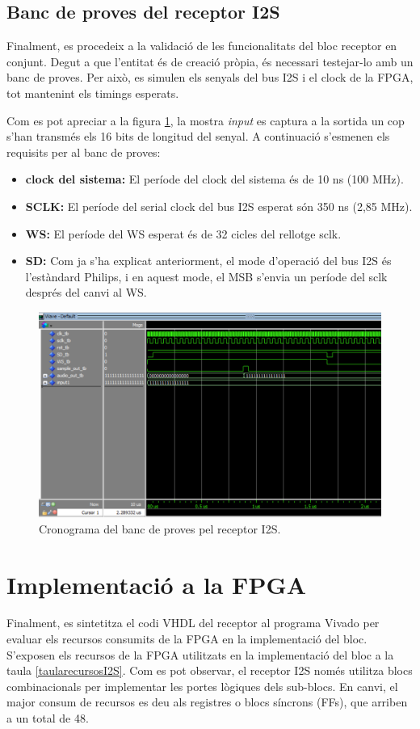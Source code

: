 \subsection{Banc de proves del receptor I2S}
\par Finalment, es procedeix a la validació de les funcionalitats del bloc receptor en conjunt. Degut a que l'entitat és de creació pròpia, és necessari testejar-lo amb un banc de proves. Per això, es simulen els senyals del bus I2S i el clock de la FPGA, tot mantenint els timings esperats. \par Com es pot apreciar a la figura \ref{figtestbenchI2S}, la mostra \textit{input} es captura a la sortida un cop s'han transmés els 16 bits de longitud del senyal. A continuació s'esmenen els requisits per al banc de proves:
\begin{itemize}
    \item \textbf{clock del sistema:} El període del clock del sistema és de 10 ns (100 MHz).
    \item \textbf{SCLK:} El període del serial clock del bus I2S esperat són 350 ns (2,85 MHz).
    \item \textbf{WS:} El període del WS esperat és de 32 cicles del rellotge sclk. 
    \item \textbf{SD:} Com ja s'ha explicat anteriorment, el mode d'operació del bus I2S és l'estàndard Philips, i en aquest mode, el MSB s'envia un període del sclk després del canvi al WS.
\end{itemize}
\begin{figure}[H]
    \centering
    \includegraphics[width=0.6\linewidth]{Images/testbenchI2S.png}
    \caption{Cronograma del banc de proves pel receptor I2S.}
    \label{figtestbenchI2S}
\end{figure}

\section{Implementació a la FPGA}
\par Finalment, es sintetitza el codi VHDL del receptor al programa Vivado per evaluar els recursos consumits de la FPGA en la implementació del bloc. S'exposen els recursos de la FPGA utilitzats en la implementació del bloc a la taula \ref{taularecursosI2S}. Com es pot observar, el receptor I2S només utilitza blocs combinacionals per implementar les portes lògiques dels sub-blocs. En canvi, el major consum de recursos es deu als registres o blocs síncrons (FFs), que arriben a un total de 48.

